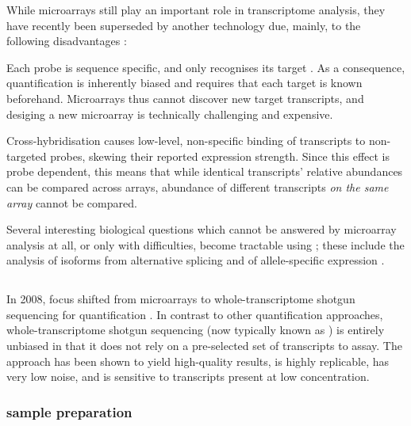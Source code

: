 While microarrays still play an important role in transcriptome analysis, they
have recently been superseded by another technology due, mainly, to the
following disadvantages \citep{Casneuf:2007,Marioni:2008}:
\begin{enumerate*}
    \item Each probe is sequence specific, and only recognises its target \mrna.
        As a consequence, quantification is inherently biased and requires that
        each target is known beforehand. Microarrays thus cannot discover new
        target transcripts, and desiging a new microarray is technically
        challenging and expensive.
    \item Cross-hybridisation causes low-level, non-specific binding of
        transcripts to non-targeted probes, skewing their reported expression
        strength. Since this effect is probe dependent, this means that
        while identical transcripts’ relative abundances can be compared across
        arrays, abundance of different transcripts \emph{on the same array}
        cannot be compared.
    \item Several interesting biological questions which cannot be answered by
        microarray analysis at all, or only with difficulties, become tractable
        using ; these include the analysis of isoforms from
        alternative splicing \citep{Katz:2010} and of allele-specific expression
        \citep{Pickrell:2010}.
\end{enumerate*}

\subsection{}

In 2008, focus shifted from microarrays to whole-transcriptome shotgun
sequencing for \rna quantification
\citep{Nagalakshmi:2008,Mortazavi:2008,Marioni:2008}. In contrast to other \rna
quantification approaches, whole-transcriptome shotgun sequencing (now typically
known as \rnaseq) is entirely unbiased in that it does not rely on a
pre-selected set of transcripts to assay. The approach has been shown to yield
high-quality results, is highly replicable, has very low noise, and is sensitive
to transcripts present at low concentration.

\subsubsection{ sample preparation}

